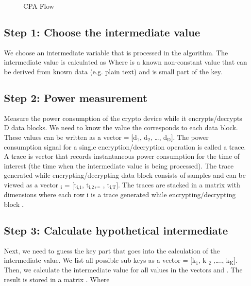 \documentclass[letterpaper,10pt,english]{sphinxmanual}
\begin{document}
\begin{figure}[htbp]
\centering
\capstart

\noindent{}
\caption{CPA Flow}\label{\detokenize{cpa:id1}}\end{figure}


\subsection{Step 1: Choose the intermediate value}
\label{\detokenize{cpa:step-1-choose-the-intermediate-value}}
We choose an intermediate variable that is processed in the algorithm. The intermediate value is calculated as 
Where  is a known non-constant value that can be derived from known data (e.g. plain text) and  is small part of the key.


\subsection{Step 2: Power measurement}
\label{\detokenize{cpa:step-2-power-measurement}}
Measure the power consumption of the  crypto device while it encrypts/decrypts D data blocks.
We need to know the value  the corresponds to each data block. These values can be written as a vector  = {[}d$_{\text{1}}$, d$_{\text{2}}$, …, d$_{\text{D}}${]}.
The power consumption signal for a single encryption/decryption operation is called a trace.
A trace is vector that records instantaneous power consumption for the time of interest (the time when the intermediate value is being processed).
The trace generated while encrypting/decrypting data block  consists of  samples and can be viewed as a vector $_{\text{i}}$ = {[}t$_{\text{i,1}}$, t$_{\text{i,2}}$,… , t$_{\text{i,T}}${]}.
The traces are stacked in a matrix  with dimensions  where each row i is a trace generated while encrypting/decrypting block .


\subsection{Step 3: Calculate hypothetical intermediate}
\label{\detokenize{cpa:step-3-calculate-hypothetical-intermediate}}
Next, we need to guess the key part that goes into the calculation of the intermediate value. We list all possible sub keys as a vector  = {[}k$_{\text{1}}$, k $_{\text{2}}$ ,…., k$_{\text{K}}${]}.
Then, we calculate the intermediate value  for all values in the vectors  and . The result is stored in a  matrix .
Where
\end{document}

